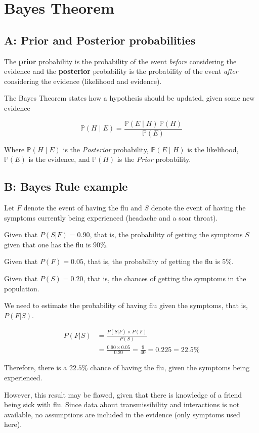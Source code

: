 
\section[Q3: Bayes Theorem]{Bayes Theorem}

\subsection{A: Prior and Posterior probabilities}

The \textbf{prior} probability is the probability of the event \textit{before} considering the evidence and the \textbf{posterior} probability is the probability of the event \textit{after} considering the evidence (likelihood and evidence).

The Bayes Theorem states how a hypothesis should be updated, given some new evidence

\begin{equation}
    \mathbb{P} \left ( H \mid E \right ) = \frac{\mathbb{P} \left ( E \mid H \right ) \, \mathbb{P} (H)}{\mathbb{P} (E)}
    \label{eq:bayes-theorem}
\end{equation}

Where $\mathbb{P} \left ( H \mid E \right )$ is the \textit{Posterior} probability, $\mathbb{P} \left ( E \mid H \right )$ is the likelihood, $\mathbb{P} (E)$ is the evidence, and $\mathbb{P} (H)$ is the \textit{Prior} probability.

\subsection{B: Bayes Rule example}

Let $F$ denote the event of having the flu and $S$ denote the event of having the symptoms currently being experienced (headache and a soar throat).

Given that $P(S | F) = 0.90$, that is, the probability of getting the symptoms $S$ given that one has the flu is $90\%$.

Given that $P(F) = 0.05$, that is, the probability of getting the flu is $5\%$.

Given that $P(S) = 0.20$, that is, the chances of getting the symptoms in the population.

We need to estimate the probability of having flu given the symptoms, that is, $P(F|S)$.

\begin{align}
    P(F|S) &= \frac{P(S|F) \times P(F)}{P(S)}
    \nonumber \\
    &= \frac{0.90 \times 0.05}{0.20} = \frac{9}{40} = 0.225 = 22.5 \%
\end{align}

Therefore, there is a $22.5 \%$ chance of having the flu, given the symptoms being experienced.

However, this result may be flawed, given that there is knowledge of a friend being sick with flu. Since data about transmissibility and interactions is not available, no assumptions are included in the evidence (only symptoms used here).
